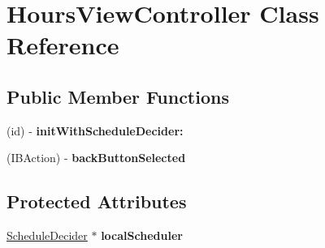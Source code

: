 \hypertarget{interface_hours_view_controller}{
\section{HoursViewController Class Reference}
\label{interface_hours_view_controller}
}
\subsection*{Public Member Functions}
\begin{DoxyCompactItemize}
\item 
\hypertarget{interface_hours_view_controller_acfb8dc370bbf761f12cf4495e6065462}{
(id) -\/ {\bfseries initWithScheduleDecider:}}
\label{interface_hours_view_controller_acfb8dc370bbf761f12cf4495e6065462}

\item 
\hypertarget{interface_hours_view_controller_ad725738e0a6cce8a2d86cd17270c5e2d}{
(IBAction) -\/ {\bfseries backButtonSelected}}
\label{interface_hours_view_controller_ad725738e0a6cce8a2d86cd17270c5e2d}

\end{DoxyCompactItemize}
\subsection*{Protected Attributes}
\begin{DoxyCompactItemize}
\item 
\hypertarget{interface_hours_view_controller_aad0acdbe40ad7c54a7f70b7adb1ae8e0}{
\hyperlink{interface_schedule_decider}{ScheduleDecider} $\ast$ {\bfseries localScheduler}}
\label{interface_hours_view_controller_aad0acdbe40ad7c54a7f70b7adb1ae8e0}

\end{DoxyCompactItemize}
